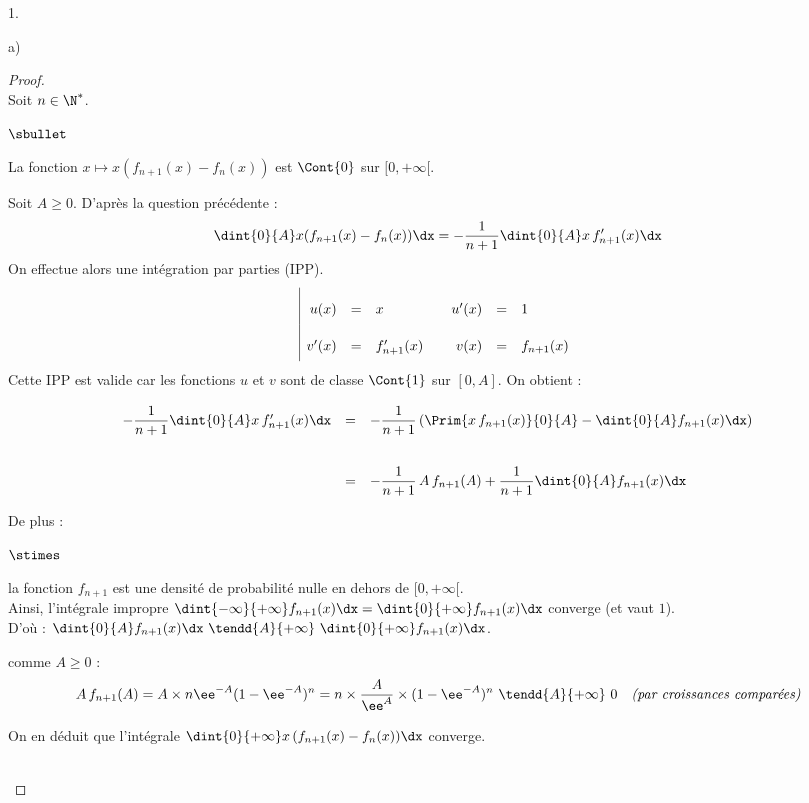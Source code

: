 \documentclass[11pt]{article}%
\begin{document}
\begin{noliste}{1.}
\begin{noliste}{a)}
  \begin{proof}~\\
    Soit $n\in\N^*$.
    \begin{noliste}{$\sbullet$}
    \item La fonction $x \mapsto x(f_{n+1}(x) - f_n(x))$ est
      $\Cont{0}$ sur $[0, +\infty[$.
    \item Soit $A\geq 0$. D'après la question précédente :
      \[
      \dint{0}{A} x(f_{n+1}(x)-f_n(x))\dx = -\dfrac{1}{n+1}
      \dint{0}{A} x \, f_{n+1}'(x)\dx
      \]
      On effectue alors une intégration par parties (IPP).
      \[
      \renewcommand{\arraystretch}{2.2}
      \begin{array}{|rcl@{\qquad}rcl}
        u(x) & = & x & u'(x) & = & 1\\
        v'(x) & = & f_{n+1}'(x) & v(x) & = & f_{n+1}(x)
      \end{array}
      \]
      Cette IPP est valide car les fonctions $u$ et $v$ sont de classe
      $\Cont{1}$ sur $[0,A]$. On obtient :
      \[
      \begin{array}{rcl}
        -\dfrac{1}{n+1} \dint{0}{A} x \, f_{n+1}'(x)\dx
        & = & -\dfrac{1}{n+1} \left( \Prim{x \, f_{n+1}(x)}{0}{A} - 
          \dint{0}{A} f_{n+1}(x) \dx \right)
        \\[.6cm]
        & = & -\dfrac{1}{n+1} \, A \, f_{n+1}(A) + \dfrac{1}{n+1}
        \dint{0}{A} f_{n+1}(x) \dx
      \end{array}
      \]
    \item De plus :
      \begin{noliste}{$\stimes$}
      \item la fonction $f_{n+1}$ est une densité de probabilité nulle
        en dehors de $[0, +\infty[$.\\[.2cm]
        Ainsi, l'intégrale impropre $\dint{-\infty}{+\infty}
        f_{n+1}(x) \dx = \dint{0}{+\infty} f_{n+1}(x) \dx$ converge
        (et vaut $1$).\\[.2cm]
        D'où : $\dint{0}{A} f_{n+1}(x)\dx \ \tendd{A}{+\infty} \
        \dint{0}{+\infty} f_{n+1}(x) \dx$.
      
      \item comme $A\geq 0$ :
        \[
        A \, f_{n+1}(A) = A \times n \ee^{-A}(1-\ee^{-A})^n = n \times
        \dfrac{A}{\ee^{A}} \times (1-\ee^{-A})^n \ \tendd{A}{+\infty}
        \ 0 \quad \mbox{\it (par croissances comparées)}
        \]
      \end{noliste}
      On en déduit que l'intégrale $\dint{0}{+\infty} x \,
      (f_{n+1}(x)-f_n(x)) \dx$ converge.
    \end{noliste}
    ~\\[-1cm]
  \end{proof}


\end{noliste}
\end{noliste}
\end{document}
